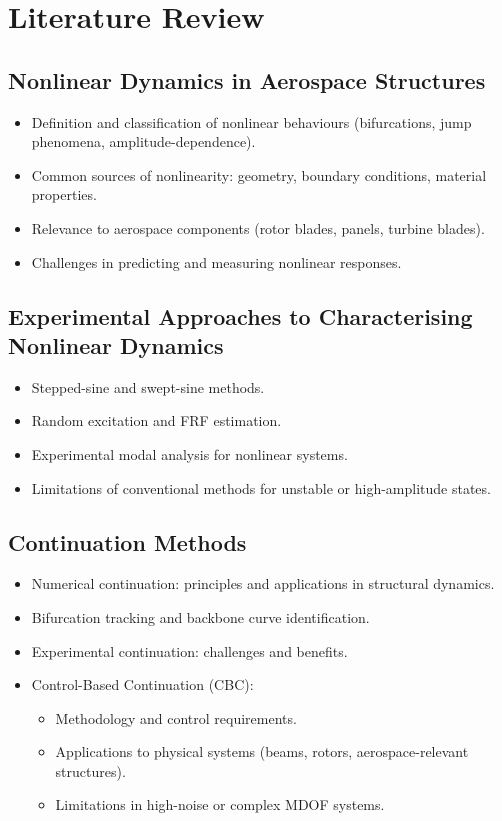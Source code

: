 \chapter{Literature Review}

\section{Nonlinear Dynamics in Aerospace Structures}
\begin{itemize}
    \item Definition and classification of nonlinear behaviours (bifurcations, jump phenomena, amplitude-dependence).
    \item Common sources of nonlinearity: geometry, boundary conditions, material properties.
    \item Relevance to aerospace components (rotor blades, panels, turbine blades).
    \item Challenges in predicting and measuring nonlinear responses.
\end{itemize}

\section{Experimental Approaches to Characterising Nonlinear Dynamics}
\begin{itemize}
    \item Stepped-sine and swept-sine methods.
    \item Random excitation and FRF estimation.
    \item Experimental modal analysis for nonlinear systems.
    \item Limitations of conventional methods for unstable or high-amplitude states.
\end{itemize}

\section{Continuation Methods}
\begin{itemize}
    \item Numerical continuation: principles and applications in structural dynamics.
    \item Bifurcation tracking and backbone curve identification.
    \item Experimental continuation: challenges and benefits.
    \item Control-Based Continuation (CBC):
    \begin{itemize}
        \item Methodology and control requirements.
        \item Applications to physical systems (beams, rotors, aerospace-relevant structures).
        \item Limitations in high-noise or complex MDOF systems.
    \end{itemize}
\end{itemize}

